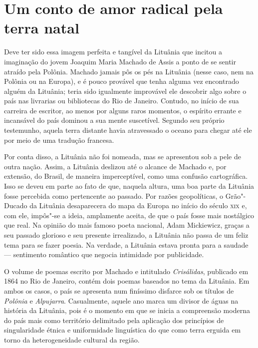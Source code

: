 \section*{Um conto de amor radical pela terra natal}

Deve ter sido essa imagem perfeita e tangível da Lituânia que incitou a
imaginação do jovem Joaquim Maria Machado de Assis a ponto de se sentir
atraído pela Polônia. Machado jamais pôs os pés na Lituânia (nesse caso,
nem na Polônia ou na Europa), e é pouco provável que tenha alguma vez
encontrado alguém da Lituânia; teria sido igualmente improvável ele
descobrir algo sobre o país nas livrarias ou bibliotecas do Rio de
Janeiro. Contudo, no início de sua carreira de escritor, ao menos por
alguns raros momentos, o espírito errante e incansável do país dominou a
sua mente suscetível. Segundo seu próprio testemunho, aquela terra
distante havia atravessado o oceano para chegar até ele por meio de uma
tradução francesa. 

Por conta disso, a Lituânia não foi nomeada, mas se
apresentou sob a pele de outra nação. Assim, a Lituânia deslizou até o
alcance de Machado e, por extensão, do Brasil, de maneira imperceptível,
como uma confusão cartográfica. Isso se deveu em parte ao fato de que,
naquela altura, uma boa parte da Lituânia fosse percebida como
pertencente ao passado. Por razões geopolíticas, o Grão"-Ducado da
Lituânia desaparecera do mapa da Europa no início do século \textsc{xix} e,
com ele, impôs"-se a ideia, amplamente aceita, de que o país fosse mais
nostálgico que real. Na opinião do mais famoso poeta nacional, Adam
Mickiewicz, graças a seu passado glorioso e seu presente irrealizado, a
Lituânia não passa de um feliz tema para se fazer poesia. Na verdade, a
Lituânia estava pronta para a saudade --- sentimento romântico que negocia
intimidade por publicidade.

O volume de poemas escrito por Machado e intitulado \textit{Crisálidas},
publicado em 1864 no Rio de Janeiro, contém dois poemas baseados no tema
da Lituânia. Em ambos os casos, o país se apresenta num finíssimo
disfarce sob os títulos de \textit{Polônia} e \textit{Alpujarra}.
Casualmente, aquele ano marca um divisor de águas na história da
Lituânia, pois é o momento em que se inicia a compreensão moderna do
país mais como território delimitado pela aplicação dos princípios de
singularidade étnica e uniformidade linguística do que como terra
erguida em torno da heterogeneidade cultural da região. 

